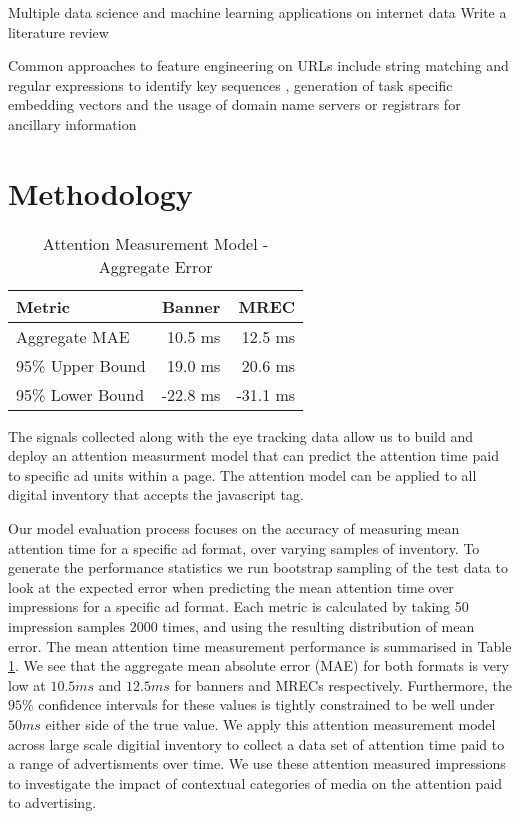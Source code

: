 \documentclass[sigconf]{acmart}
\begin{document}
Multiple data science and machine learning applications on internet data 
Write a literature review \cite{Vazhayil2018}
\cite{Canali2011}
\cite{Ayes2019}
\cite{Mamun2016}
\cite{Li2020}
\cite{Basnet2012}
\cite{Basnet2014}
\cite{Tupsamudre2019}
\cite{Le2018}
\cite{Baykan2009}
\cite{Kan2005}
\cite{Hernandez2012}
\cite{Chung2022}
\cite{Qiu2020}
\cite{Vaishnavi2021}
\cite{Xu2021}
\cite{Rhea2022}


Common approaches to feature engineering on URLs include string matching and regular expressions to
identify key sequences \cite{}, generation of task specific embedding vectors\cite{Qiu2020} and the
usage of domain name servers or registrars for ancillary information \cite{}


\section{Methodology}


\begin{table}
  \caption{Attention Measurement Model - Aggregate Error}
  \label{tab:atm}
\begin{tabular}{|l|r|r|}
\toprule
Metric                  &Banner       &MREC       \\
\midrule
Aggregate MAE           &10.5 ms      &12.5 ms    \\
95\% Upper Bound        &19.0 ms      &20.6 ms    \\
95\% Lower Bound        &-22.8 ms     &-31.1 ms   \\
  \bottomrule
\end{tabular}
\end{table}

The signals collected along with the eye tracking data allow us to build and deploy an
attention measurment model that can predict the attention time paid to
specific ad units within a page. The attention model can
be applied to all digital inventory that accepts the javascript tag.

Our model evaluation process focuses on the accuracy of measuring mean
attention time for a specific ad format, over varying samples of inventory.
To generate the performance statistics we run bootstrap sampling of the test data
to look at the expected error when predicting the mean attention time over
impressions for a specific ad format. Each metric is calculated by taking 50 impression
samples 2000 times, and using the resulting distribution of mean error.
The mean attention time measurement performance is summarised in Table
\ref{tab:atm}.
We see that the aggregate mean absolute error (MAE) for both formats is very low
at $10.5 ms$ and $12.5 ms$ for banners and MRECs respectively. Furthermore, the
$95\%$ confidence intervals for these values is tightly constrained to be well under
$50 ms$ either side of the true value.
We apply this attention measurement model across large scale digitial inventory to
collect a data set of attention time paid to a range of advertisments over time.
We use these attention measured impressions to investigate the
impact of contextual categories of media on the attention paid to advertising.
\end{document}
